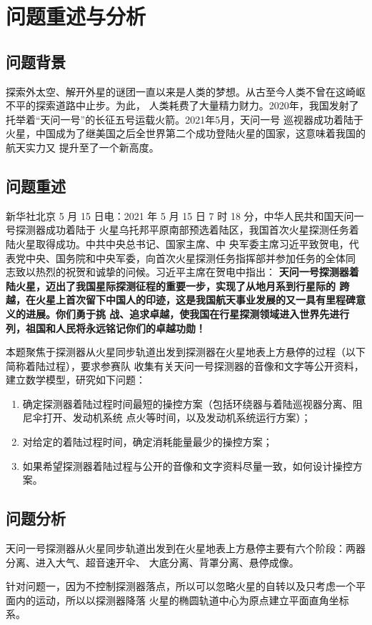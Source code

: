 \documentclass[hyperref,a4paper,UTF8]{ctexart}
\begin{document}
\section{问题重述与分析}
\subsection{问题背景}
探索外太空、解开外星的谜团一直以来是人类的梦想。从古至今人类不曾在这崎岖不平的探索道路中止步。为此，
人类耗费了大量精力财力。2020年，我国发射了托举着“天问一号”的长征五号运载火箭。2021年5月，天问一号
巡视器成功着陆于火星，中国成为了继美国之后全世界第二个成功登陆火星的国家，这意味着我国的航天实力又
提升至了一个新高度。
\subsection{问题重述}
新华社北京 5 月 15 日电：2021 年 5 月 15 日 7 时 18 分，中华人民共和国天问一号探测器成功着陆于
火星乌托邦平原南部预选着陆区，我国首次火星探测任务着陆火星取得成功。中共中央总书记、国家主席、中
央军委主席习近平致贺电，代表党中央、国务院和中央军委，向首次火星探测任务指挥部并参加任务的全体同
志致以热烈的祝贺和诚挚的问候。习近平主席在贺电中指出：%
\textbf{天问一号探测器着陆火星，迈出了我国星际探测征程的重要一步，实现了从地月系到行星际的
    跨越，在火星上首次留下中国人的印迹，这是我国航天事业发展的又一具有里程碑意义的进展。你们勇于挑
    战、追求卓越，使我国在行星探测领域进入世界先进行列，祖国和人民将永远铭记你们的卓越功勋！}

本题聚焦于探测器从火星同步轨道出发到探测器在火星地表上方悬停的过程（以下简称着陆过程），要求参赛队
收集有关天问一号探测器的音像和文字等公开资料，建立数学模型，研究如下问题：
\begin{enumerate}
    \item 确定探测器着陆过程时间最短的操控方案（包括环绕器与着陆巡视器分离、阻尼伞打开、发动机系统
          点火等时间，以及发动机系统运行方案）；
    \item 对给定的着陆过程时间，确定消耗能量最少的操控方案；
    \item 如果希望探测器着陆过程与公开的音像和文字资料尽量一致，如何设计操控方案。
\end{enumerate}
\subsection{问题分析}
天问一号探测器从火星同步轨道出发到在火星地表上方悬停主要有六个阶段：两器分离、进入大气、超音速开伞、
大底分离、背罩分离、悬停成像。

针对问题一，因为不控制探测器落点，所以可以忽略火星的自转以及只考虑一个平面内的运动，所以以探测器降落
火星的椭圆轨道中心为原点建立平面直角坐标系。
\end{document}
